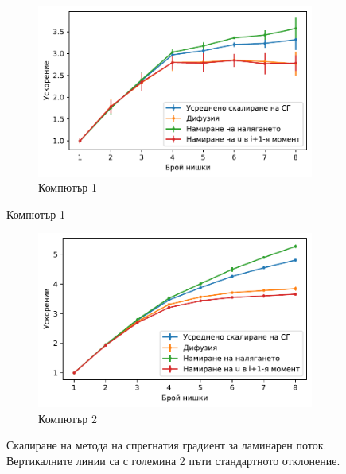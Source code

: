 \documentclass[12pt]{report}
\begin{document}
\begin{figure}[H]
  \centering
  \begin{subfigure}[b]{0.8\textwidth}
      \centering
      \includegraphics[width=\textwidth]{Figures/BG/LaminarCGSpeedUpC1.pdf}
      \caption{Компютър 1}
  \end{subfigure}
\end{figure}
\begin{figure}[H]
	\centering
  \ContinuedFloat
  \begin{subfigure}[b]{0.8\textwidth}
      \centering
      \includegraphics[width=\textwidth]{Figures/BG/LaminarCGSpeedUpC2.pdf}
      \caption{Компютър 2}
  \end{subfigure}\caption{Скалиране на метода на спрегнатия градиент за ламинарен поток. Вертикалните линии са с големина 2 пъти стандартното отклонение.}
  \label{fig:laminar-scaling}
\end{figure}
\end{document}
